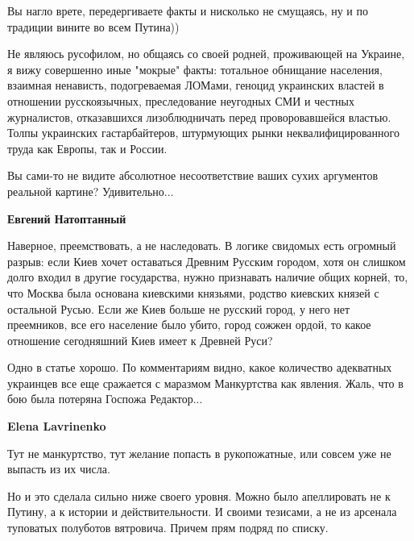 \begin{itemize}
\begin{itemize}
Вы нагло врете, передергиваете факты и нисколько не смущаясь, ну и по традиции
вините во всем Путина))

Не являюсь русофилом, но общаясь со своей родней, проживающей на Украине, я
вижу совершенно иные "мокрые" факты: тотальное обнищание населения, взаимная
ненависть, подогреваемая ЛОМами, геноцид украинских властей в отношении
русскоязычных, преследование неугодных СМИ и честных журналистов, отказавшихся
лизоблюдничать перед проворовавшейся властью. Толпы украинских гастарбайтеров,
штурмующих рынки неквалифицированного труда как Европы, так и России.

Вы сами-то не видите абсолютное несоответствие ваших сухих аргументов реальной
картине? Удивительно...


 
\textbf{Евгений Натоптанный} 

Наверное, преемствовать, а не наследовать. В логике свидомых есть огромный
разрыв: если Киев хочет оставаться Древним Русским городом, хотя он слишком
долго входил в другие государства, нужно признавать наличие общих корней, то,
что Москва была основана киевскими князьями, родство киевских князей с
остальной Русью. Если же Киев больше не русский город, у него нет преемников,
все его население было убито, город сожжен ордой, то какое отношение
сегодняшний Киев имеет к Древней Руси?

Одно в статье хорошо. По комментариям видно, какое количество адекватных
украинцев все еще сражается с маразмом Манкуртства как явления. Жаль, что в бою
была потеряна Госпожа Редактор...

 

\textbf{Elena Lavrinenko} 

Тут не манкуртство, тут желание попасть в рукопожатные, или совсем уже не
выпасть из их числа.

Но и это сделала сильно ниже своего уровня. Можно было апеллировать не к
Путину, а к истории и действительности. И своими тезисами, а не из арсенала
туповатых полуботов вятровича. Причем прям подряд по списку.


\end{itemize}
\end{itemize}
